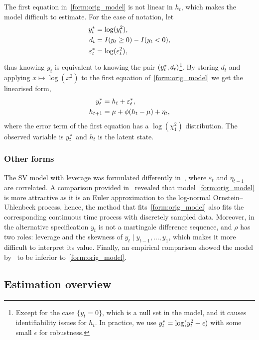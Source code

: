 The first equation in~\eqref{form:orig_model} is not linear in $h_t$, which makes the model difficult to estimate. For the ease of notation, let
\begin{align*}
y_t^\ast &=\log(y^2_t), \\
d_t &=I(y_t\ge0)-I(y_t<0), \\
\varepsilon_t^\ast &=\log(\varepsilon^2_t),
\end{align*}
thus knowing $y_t$ is equivalent to knowing the pair $(y_t^\ast, d_t)$\footnote{Except for the case $\{y_t=0\}$, which is a null set in the model, and it causes identifiability issues for $h_t$. In practice, we use $y_t^\ast =\log(y^2_t+\epsilon)$ with some small $\epsilon$ for robustness.}. By storing $d_t$ and applying $x\mapsto\log(x^2)$ to the first equation of~\eqref{form:orig_model} we get the linearised form,
\begin{align}
\begin{split}\label{form:lin_model}
y_t^\ast & = h_t+\varepsilon_t^\ast, \\
h_{t+1} & = \mu+\phi(h_t-\mu)+\eta_t,
\end{split}
\end{align}
where the error term of the first equation has a $\log(\chi_1^2)$ distribution. The observed variable is $y_t^\ast$ and $h_t$ is the latent state.

\subsubsection{Other forms}

The SV model with leverage was formulated differently in~\citet{Jacquier2004}, where $\varepsilon_t$ and $\eta_{t-1}$ are correlated.
A comparison provided in~\citet{yu2005leverage} revealed that model~\ref{form:orig_model} is more attractive as it is an Euler approximation to the log-normal Ornstein--Uhlenbeck process, hence, the method that fits~\ref{form:orig_model} also fits the corresponding continuous time process with discretely sampled data.
Moreover, in the alternative specification $y_t$ is not a martingale difference sequence, and $\rho$ has two roles: leverage and the skewness of $y_t\mid y_{t-1},\dots,y_1$, which makes it more difficult to interpret its value.
Finally, an empirical comparison showed the model by~\citeauthor{Jacquier2004} to be inferior to~\ref{form:orig_model}.

\subsection{Estimation overview}

